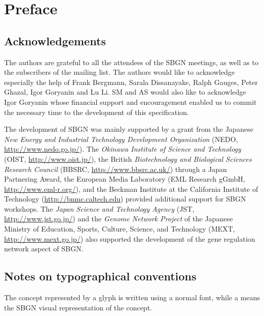 
\chapter{Preface}

\section*{Acknowledgements}

The authors are grateful to all the attendees of the SBGN meetings, as well as to the subscribers of the  mailing list.  The authors would like to acknowledge especially the help of Frank Bergmann, Sarala Dissanayake, Ralph Gauges, Peter Ghazal, Igor Goryanin and Lu Li. SM and AS would also like to acknowledge Igor Goryanin whose financial support and encouragement enabled us to commit the necessary time to the development of this specification.


The development of SBGN was mainly supported by a grant from the Japanese
\emph{New Energy and Industrial Technology Development Organization} (NEDO,
\url{http://www.nedo.go.jp/}).  The \emph{Okinawa Institute of Science and
  Technology} (OIST, \url{http://www.oist.jp/}), the British
\emph{Biotechnology and Biological Sciences Research Council} (BBSRC,
\url{http://www.bbsrc.ac.uk/}) through a Japan Partnering Award, the
European Media Laboratory (EML Research gGmbH,
\url{http://www.eml-r.org/}), and the Beckman Institute at the California
Institute of Technology (\url{http://bnmc.caltech.edu}) provided additional
support for SBGN workshops.  The \emph{Japan Science and Technology Agency}
(JST, \url{http://www.jst.go.jp/}) and the \emph{Genome Network Project} of
the Japanese Ministry of Education, Sports, Culture, Science, and
Technology (MEXT, \url{http://www.mext.go.jp/}) also supported the
development of the gene regulation network aspect of SBGN.

\section*{Notes on typographical conventions}

The concept represented by a glyph is written using a normal font, while a  means the SBGN visual representation of the concept.




